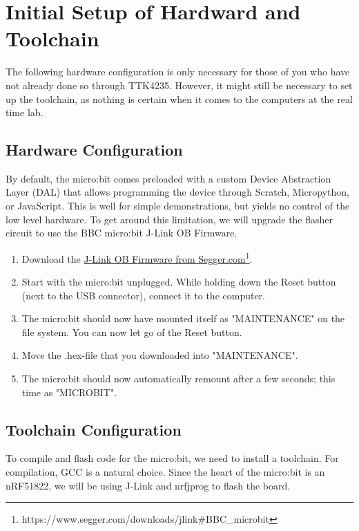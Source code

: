 \documentclass[11pt,a4paper]{article}
\begin{document}
\section{Initial Setup of Hardward and Toolchain}
The following hardware configuration is only necessary for those of you who have not already done so through TTK4235. However, it might still be necessary to set up the toolchain, as nothing is certain when it comes to the computers at the real time lab.

\subsection{Hardware Configuration}
By default, the micro:bit comes preloaded with a custom Device Abstraction Layer (DAL) that allows programming the device through Scratch, Micropython, or JavaScript. This is well for simple demonstrations, but yields no control of the low level hardware. To get around this limitation, we will upgrade the flasher circuit to use the BBC micro:bit J-Link OB Firmware.

\begin{enumerate}
\item Download the \href{https://www.segger.com/downloads/jlink#BBC\_microbit}{J-Link OB Firmware from Segger.com}\footnote{https://www.segger.com/downloads/jlink\#BBC\_microbit}.
\item Start with the micro:bit unplugged. While holding down the Reset button (next to the USB connector), connect it to the computer.
\item The micro:bit should now have mounted itself as "MAINTENANCE" on the file system. You can now let go of the Reset button.
\item Move the .hex-file that you downloaded into "MAINTENANCE".
\item The micro:bit should now automatically remount after a few seconds; this time as "MICROBIT".
\end{enumerate}

\subsection{Toolchain Configuration}
\label{sec::toolchain_config}
To compile and flash code for the micro:bit, we need to install a toolchain. For compilation, GCC is a natural choice. Since the heart of the micro:bit is an nRF51822, we will be using J-Link and nrfjprog to flash the board.
\end{document}
